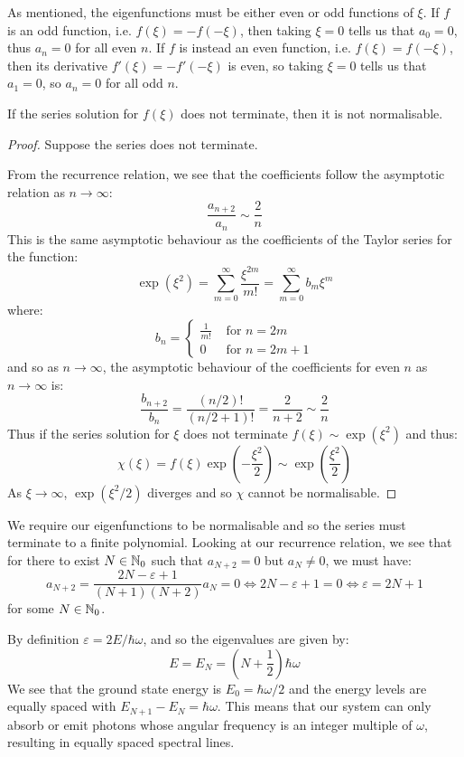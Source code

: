 \documentclass[../main.tex]{subfiles}
\begin{document}
As mentioned, the eigenfunctions must be either even or odd functions of $\xi$.
If $f$ is an odd function, i.e. $f(\xi) = -f(-\xi)$, then taking $\xi = 0$ tells us that $a_0 = 0$, thus $a_n = 0$ for all even $n$.
If $f$ is instead an even function, i.e. $f(\xi) = f(-\xi)$, then its derivative $f'(\xi) = -f'(-\xi)$ is even, so taking $\xi = 0$ tells us that $a_1 = 0$, so $a_n = 0$ for all odd $n$.
\begin{proposition}
  If the series solution for $f(\xi)$ does not terminate, then it is not normalisable.
\end{proposition}
\begin{proof}
  Suppose the series does not terminate.

  From the recurrence relation, we see that the coefficients follow the asymptotic relation as $n \to \infty$:
  \[
    \frac{a_{n + 2}}{a_n} \sim \frac{2}{n}
  \]
  This is the same asymptotic behaviour as the coefficients of the Taylor series for the function:
  \[
    \exp(\xi^2) = \sum_{m = 0}^{\infty} \frac{\xi^{2m}}{m!} = \sum_{m = 0}^{\infty} b_m \xi^{m}
  \]
  where:
  \[
    b_n = \begin{cases}
    \frac{1}{m!} & \text{ for } n = 2m \\
    0 & \text{ for } n = 2m + 1
    \end{cases}
  \]
  and so as $n \to \infty$, the asymptotic behaviour of the coefficients for even $n$ as $n \to \infty$ is:
  \[
    \frac{b_{n + 2}}{b_n} = \frac{(n / 2)!}{(n/2 + 1)!} = \frac{2}{n + 2} \sim \frac{2}{n}
  \]
  Thus if the series solution for $\xi$ does not terminate $f(\xi) \sim \exp(\xi^2)$ and thus:
  \[
    \chi(\xi) = f(\xi) \exp\left(-\frac{\xi^2}{2}\right) \sim \exp\left(\frac{\xi^2}{2}\right)
  \]
  As $\xi \to \infty$, $\exp(\xi^2/2)$ diverges and so $\chi$ cannot be normalisable.
\end{proof}
We require our eigenfunctions to be normalisable and so the series must terminate to a finite polynomial.
Looking at our recurrence relation, we see that for there to exist $N \in \mathbb{N}_0$ such that $a_{N + 2} = 0$ but $a_{N} \neq 0$, we must have:
\[
  a_{N + 2} = \frac{2N - \varepsilon + 1}{(N + 1)(N + 2)} a_N = 0 \iff 2N - \varepsilon + 1 = 0 \iff \varepsilon = 2N + 1
\]
for some $N \in \mathbb{N}_0$.

By definition $\varepsilon = 2E/\hbar \omega$, and so the eigenvalues are given by:
\begin{equation}
  E = E_N = \left(N + \frac{1}{2}\right) \hbar \omega \label{energyOsc}
\end{equation}
We see that the ground state energy is $E_0 = \hbar \omega/2$ and the energy levels are equally spaced with $E_{N + 1} - E_N = \hbar \omega$.
This means that our system can only absorb or emit photons whose angular frequency is an integer multiple of $\omega$, resulting in equally spaced spectral lines.
\end{document}
